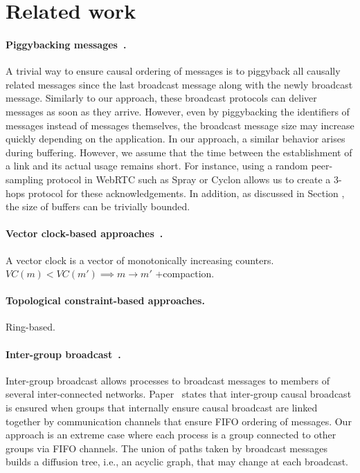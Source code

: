
\section{Related work}
\label{sec:relatedwork}


\paragraph{Piggybacking messages~\cite{birman1987reliable,hadzilacos1993fault}.}
A trivial way to ensure causal ordering of messages is to piggyback all causally
related messages since the last broadcast message along with the newly broadcast
message. Similarly to our approach, these broadcast protocols can deliver
messages as soon as they arrive.  However, even by piggybacking the identifiers
of messages instead of messages themselves, the broadcast message size may
increase quickly depending on the application. In our approach, a similar
behavior arises during buffering. However, we assume that the time between the
establishment of a link and its actual usage remains short. For instance, using
a random peer-sampling protocol in WebRTC such as Spray or Cyclon allows us to
create a 3-hops protocol for these acknowledgements. In addition, as discussed
in Section , the size of buffers can be trivially
bounded. 

\paragraph{Vector clock-based
  approaches~\cite{fidge1988timestamps,mattern1989virtual}.} A vector clock is a
vector of monotonically increasing counters.
$VC(m) < VC(m') \implies m \rightarrow m'$ +compaction.

\paragraph{Topological constraint-based approaches.} Ring-based. 

\paragraph{Inter-group
  broadcast~\cite{johnson1998scalable,johnson1999intergroup}.} Inter-group
broadcast allows processes to broadcast messages to members of several
inter-connected networks. Paper~\cite{johnson1999intergroup} states that
inter-group causal broadcast is ensured when groups that internally ensure
causal broadcast are linked together by communication channels that ensure FIFO
ordering of messages. Our approach is an extreme case where each process is a
group connected to other groups via FIFO channels. The union of paths taken by
broadcast messages builds a diffusion tree, i.e., an acyclic graph, that may
change at each broadcast.


